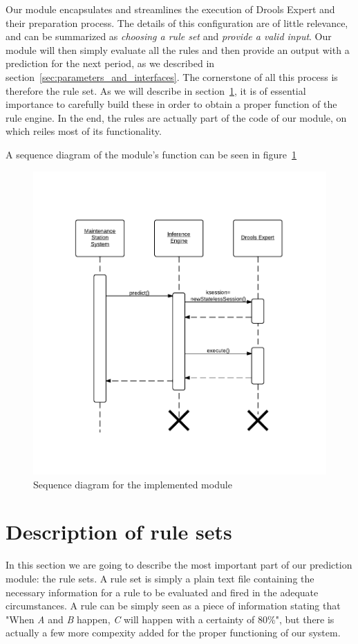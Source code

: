 Our module encapsulates and streamlines the execution of Drools Expert and their preparation process. The details of this configuration are of little relevance, and can be summarized as \emph{choosing a rule set} and \emph{provide a valid input}. Our module will then simply evaluate all the rules and then provide an output with a prediction for the next period, as we described in section~\ref{sec:parameters_and_interfaces}. The cornerstone of all this process is therefore the rule set. As we will describe in section~\ref{sec:description_of_rule_sets}, it is of essential importance to carefully build these in order to obtain a proper function of the rule engine. In the end, the rules are actually part of the code of our module, on which reiles most of its functionality.

A sequence diagram of the module's function can be seen in figure~\ref{fig:prototypeSequence}

\begin{figure}[hbtp]
\includegraphics[width=\textwidth]{img/prototypeSequence.pdf}
\caption{Sequence diagram for the implemented module} \label{fig:prototypeSequence}
\end{figure}

\section{Description of rule sets}
\label{sec:description_of_rule_sets}
In this section we are going to describe the most important part of our prediction module: the rule sets. A rule set is simply a plain text file containing the necessary information for a rule to be evaluated and fired in the adequate circumstances. A rule can be simply seen as a piece of information stating that "When \emph{A} and \emph{B} happen, \emph{C} will happen with a certainty of 80\%", but there is actually a few more compexity added for the proper functioning of our system.

